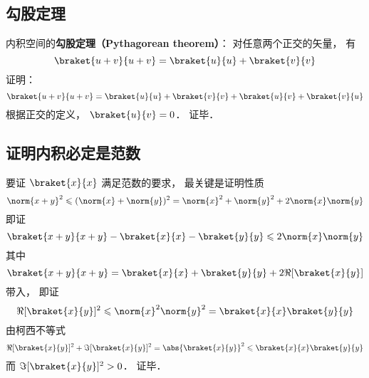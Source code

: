 \subsection{勾股定理}
内积空间的\textbf{勾股定理（Pythagorean theorem）}： 对任意两个正交的矢量， 有
\begin{equation}\label{InerPd_eq1}
\braket{u + v}{u + v} = \braket{u}{u} + \braket{v}{v}
\end{equation}
证明：
\begin{equation}
\braket{u + v}{u + v} = \braket{u}{u} + \braket{v}{v} + \braket{u}{v} + \braket{v}{u}
\end{equation}
根据正交的定义， $\braket{u}{v} = 0$． 证毕．

\subsection{证明内积必定是范数}
要证 $\braket{x}{x}$ 满足范数的要求， 最关键是证明性质
\begin{equation}
\norm{x+y}^2 \leqslant (\norm{x} + \norm{y})^2 = \norm{x}^2 + \norm{y}^2 + 2\norm{x}\norm{y}
\end{equation}
即证
\begin{equation}
\braket{x+y}{x+y} - \braket{x}{x} - \braket{y}{y} \leqslant 2\norm{x}\norm{y}
\end{equation}
其中
\begin{equation}
\braket{x+y}{x+y} = \braket{x}{x} + \braket{y}{y} + 2\Re[{\braket{x}{y}}]
\end{equation}
带入， 即证
\begin{equation}
\Re[{\braket{x}{y}}]^2 \leqslant \norm{x}^2\norm{y}^2 = \braket{x}{x}\braket{y}{y}
\end{equation}
由柯西不等式
\begin{equation}
\Re[\braket{x}{y}]^2 + \Im[\braket{x}{y}]^2 = \abs{\braket{x}{y}}^2 \leqslant \braket{x}{x}\braket{y}{y}
\end{equation}
而 $\Im[\braket{x}{y}]^2 > 0$． 证毕．
